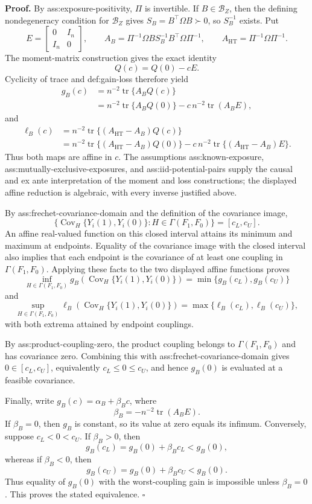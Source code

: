 \textbf{Proof.}
By ass:exposure-positivity, \(\Pi\) is invertible.  If \(B\in\mathcal B_Z\), then the defining nondegeneracy condition for \(\mathcal B_Z\) gives \(S_B=B^{\top}\Omega B\succ0\), so \(S_B^{-1}\) exists.  Put
\[
E=\begin{bmatrix}0&I_n\\ I_n&0\end{bmatrix},\qquad
A_B=\Pi^{-1}\Omega B S_B^{-1}B^{\top}\Omega\Pi^{-1},\qquad
A_{\mathrm{HT}}=\Pi^{-1}\Omega\Pi^{-1}.
\]
The moment-matrix construction gives the exact identity
\[
Q(c)=Q(0)-cE.
\]
Cyclicity of trace and def:gain-loss therefore yield
\[
\begin{aligned}
g_B(c)
&=n^{-2}\operatorname{tr}\{A_BQ(c)\}\\
&=n^{-2}\operatorname{tr}\{A_BQ(0)\}
-c\,n^{-2}\operatorname{tr}(A_BE),
\end{aligned}
\]
and
\[
\begin{aligned}
\ell_B(c)
&=n^{-2}\operatorname{tr}\{(A_{\mathrm{HT}}-A_B)Q(c)\}\\
&=n^{-2}\operatorname{tr}\{(A_{\mathrm{HT}}-A_B)Q(0)\}
-c\,n^{-2}\operatorname{tr}\{(A_{\mathrm{HT}}-A_B)E\}.
\end{aligned}
\]
Thus both maps are affine in \(c\).  The assumptions ass:known-exposure, ass:mutually-exclusive-exposures, and ass:iid-potential-pairs supply the causal and ex ante interpretation of the moment and loss constructions; the displayed affine reduction is algebraic, with every inverse justified above.

By ass:frechet-covariance-domain and the definition of the covariance image,
\[
\bigl\{\operatorname{Cov}_H\{Y_i(1),Y_i(0)\}:H\in\Gamma(F_1,F_0)\bigr\}
=[c_L,c_U].
\]
An affine real-valued function on this closed interval attains its minimum and maximum at endpoints.  Equality of the covariance image with the closed interval also implies that each endpoint is the covariance of at least one coupling in \(\Gamma(F_1,F_0)\).  Applying these facts to the two displayed affine functions proves
\[
\inf_{H\in\Gamma(F_1,F_0)}g_B\!\left(\operatorname{Cov}_H\{Y_i(1),Y_i(0)\}\right)
=\min\{g_B(c_L),g_B(c_U)\}
\]
and
\[
\sup_{H\in\Gamma(F_1,F_0)}\ell_B\!\left(\operatorname{Cov}_H\{Y_i(1),Y_i(0)\}\right)
=\max\{\ell_B(c_L),\ell_B(c_U)\},
\]
with both extrema attained by endpoint couplings.

By ass:product-coupling-zero, the product coupling belongs to \(\Gamma(F_1,F_0)\) and has covariance zero.  Combining this with ass:frechet-covariance-domain gives \(0\in[c_L,c_U]\), equivalently \(c_L\le0\le c_U\), and hence \(g_B(0)\) is evaluated at a feasible covariance.

Finally, write \(g_B(c)=\alpha_B+\beta_Bc\), where
\[
\beta_B=-n^{-2}\operatorname{tr}(A_BE).
\]
If \(\beta_B=0\), then \(g_B\) is constant, so its value at zero equals its infimum.  Conversely, suppose \(c_L<0<c_U\).  If \(\beta_B>0\), then
\[
g_B(c_L)=g_B(0)+\beta_Bc_L<g_B(0),
\]
whereas if \(\beta_B<0\), then
\[
g_B(c_U)=g_B(0)+\beta_Bc_U<g_B(0).
\]
Thus equality of \(g_B(0)\) with the worst-coupling gain is impossible unless \(\beta_B=0\).  This proves the stated equivalence. \(\square\)